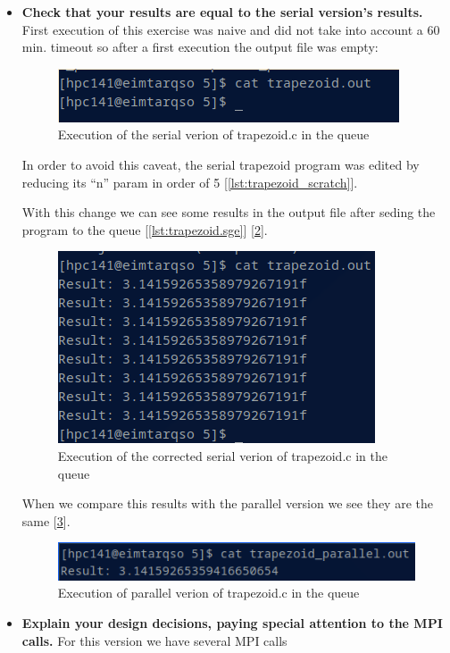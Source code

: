 \documentclass[11pt]{article}
\begin{document}

\begin{itemize}
    \item \textbf{Check that your results are equal to the serial version's results.}
    First execution of this exercise was naive and did not take into account a 60 min. timeout so after a first execution the output file was empty:
    \begin{figure}[h!]
        \centering
        \includegraphics[scale=0.7]{trapezoid_serial_bad.png}
        \caption*{Execution of the serial verion of trapezoid.c in the queue}
        \label{fig:5}
    \end{figure}
    In order to avoid this caveat, the serial trapezoid program was edited by reducing its ``n'' param in order of 5 [\ref{lst:trapezoid_scratch}].
    
    With this change we can see some results in the output file after seding the program to the queue [\ref{lst:trapezoid.sge}] [\ref{fig:5.1}].
    
    \begin{figure}[h!]
        \centering
        \includegraphics[scale=0.7]{trapezoid_serial_good.png}
        \caption*{Execution of the corrected serial verion of trapezoid.c in the queue}
        \label{fig:5.1}
    \end{figure}
    When we compare this results with the parallel version we see they are the same [\ref{fig:5.2}].
    \begin{figure}[h!]
        \centering
        \includegraphics[scale=0.7]{trapezoid.png}
        \caption*{Execution of parallel verion of trapezoid.c in the queue}
        \label{fig:5.2}
    \end{figure}
    \item \textbf{Explain your design decisions, paying special attention to the MPI calls.}
    For this version we have several MPI calls


\end{itemize}
\end{document}
